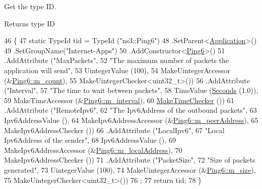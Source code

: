Get the type ID. 

\begin{DoxyReturn}{Returns}
type ID 
\end{DoxyReturn}

\begin{DoxyCode}
46 \{
47   \textcolor{keyword}{static} TypeId tid = TypeId (\textcolor{stringliteral}{"ns3::Ping6"})
48     .SetParent<\hyperlink{classns3_1_1Application_acd261926c72b02cdb48fc7f8838ee173}{Application}>()
49     .SetGroupName(\textcolor{stringliteral}{"Internet-Apps"})
50     .AddConstructor<\hyperlink{classns3_1_1Ping6_ae8e1d69e01faad084ccb8e4bbf0d6957}{Ping6}>()
51     .AddAttribute (\textcolor{stringliteral}{"MaxPackets"}, 
52                    \textcolor{stringliteral}{"The maximum number of packets the application will send"},
53                    UintegerValue (100),
54                    MakeUintegerAccessor (&\hyperlink{classns3_1_1Ping6_a7a42b5561b73f3923bee2dcc204e5667}{Ping6::m\_count}),
55                    MakeUintegerChecker<uint32\_t>())
56     .AddAttribute (\textcolor{stringliteral}{"Interval"}, 
57                    \textcolor{stringliteral}{"The time to wait between packets"},
58                    TimeValue (\hyperlink{group__timecivil_ga33c34b816f8ff6628e33d5c8e9713b9e}{Seconds} (1.0)),
59                    MakeTimeAccessor (&\hyperlink{classns3_1_1Ping6_a9cc64d279cdfae296f88bce219af3c72}{Ping6::m\_interval}),
60                    \hyperlink{group__time_ga7032965bd4afa578691d88c09e4481c1}{MakeTimeChecker} ())
61     .AddAttribute (\textcolor{stringliteral}{"RemoteIpv6"}, 
62                    \textcolor{stringliteral}{"The Ipv6Address of the outbound packets"},
63                    Ipv6AddressValue (),
64                    MakeIpv6AddressAccessor (&\hyperlink{classns3_1_1Ping6_ad0b9bf2e656c09ab204d51d0a04e4b25}{Ping6::m\_peerAddress}),
65                    MakeIpv6AddressChecker ())
66     .AddAttribute (\textcolor{stringliteral}{"LocalIpv6"}, 
67                    \textcolor{stringliteral}{"Local Ipv6Address of the sender"},
68                    Ipv6AddressValue (),
69                    MakeIpv6AddressAccessor (&\hyperlink{classns3_1_1Ping6_a3d25a5fb60b248d4ad776a97f17cc0d4}{Ping6::m\_localAddress}),
70                    MakeIpv6AddressChecker ())
71     .AddAttribute (\textcolor{stringliteral}{"PacketSize"}, 
72                    \textcolor{stringliteral}{"Size of packets generated"},
73                    UintegerValue (100),
74                    MakeUintegerAccessor (&\hyperlink{classns3_1_1Ping6_ad39776241ec4bf07226382aeeb53924a}{Ping6::m\_size}),
75                    MakeUintegerChecker<uint32\_t>())
76   ;
77   \textcolor{keywordflow}{return} tid;
78 \}
\end{DoxyCode}


